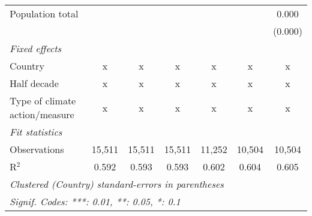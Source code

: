 \begin{tabular}{lcccccc}
   Population total                                                     &         &                &                &                &                & 0.000\\   
                                                                        &         &                &                &                &                & (0.000)\\   
   \emph{Fixed effects}\\
   Country                                                              & x       & x              & x              & x              & x              & x\\  
   Half decade                                                          & x       & x              & x              & x              & x              & x\\  
   Type of climate action/measure                                       & x       & x              & x              & x              & x              & x\\  
   \midrule \emph{Fit statistics}\\
   Observations                                                         & 15,511  & 15,511         & 15,511         & 11,252         & 10,504         & 10,504\\  
   R$^2$                                                                & 0.592   & 0.593          & 0.593          & 0.602          & 0.604          & 0.605\\  
   \midrule
   \multicolumn{7}{l}{\emph{Clustered (Country) standard-errors in parentheses}}\\
   \multicolumn{7}{l}{\emph{Signif. Codes: ***: 0.01, **: 0.05, *: 0.1}}\\
\end{tabular}
\par\endgroup


